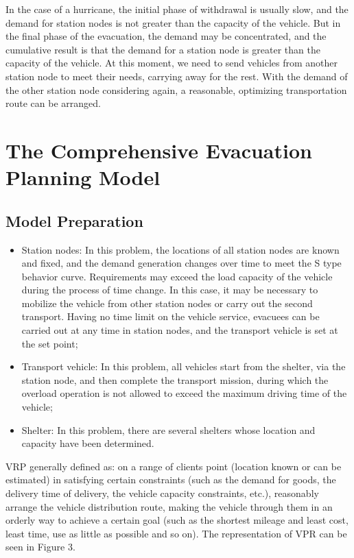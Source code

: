 \documentclass{mcmthesis}
\begin{document}
In the case of a hurricane, the initial phase of withdrawal is usually slow, and the demand for station nodes is not greater than the capacity of the vehicle. But in the final phase of the evacuation, the demand may be concentrated, and the cumulative result is that the demand for a station node is greater than the capacity of the vehicle. At this moment, we need  to send vehicles from another station node to meet their needs, carrying away for the rest. With the demand of the other station node considering again, a reasonable, optimizing transportation route can be arranged.

\section{The Comprehensive Evacuation Planning Model}
\subsection{Model Preparation}

\begin{itemize}

  \item Station nodes: In this problem, the locations of all station nodes are known and fixed, and the demand generation changes over time to meet the S type behavior curve. Requirements may exceed the load capacity of the vehicle during the process of time change. In this case, it may be necessary to mobilize the vehicle from other station nodes or carry out the second transport. Having no time limit on the vehicle service, evacuees can be carried out at any time in station nodes, and the transport vehicle is set at the set point;
  \item Transport vehicle: In this problem, all vehicles start from the shelter, via the station node, and then complete the transport mission, during which the overload operation is not allowed to exceed the maximum driving time of the vehicle;

  \item Shelter: In this problem, there are several shelters whose location and capacity have been determined.
\end{itemize}

VRP \cite{Dikas2016Solving,He2015Model} generally defined as: on a range of clients point (location known or can be estimated) in satisfying certain constraints (such as the demand for goods, the delivery time of delivery, the vehicle capacity constraints, etc.), reasonably arrange the vehicle distribution route, making the vehicle through them in an orderly way to achieve a certain goal (such as the shortest mileage and least cost, least time, use as little as possible and so on). The representation of VPR can be seen in Figure 3.
\end{document}

